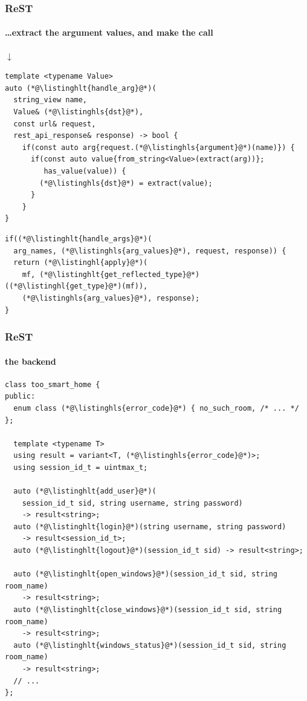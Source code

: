 \documentclass[compress,table,xcolor=table]{beamer}
\begin{document}
\begin{frame}[fragile]
  \frametitle{ReST}
  \framesubtitle{\ldots extract the argument values, and make the call}
  \smaller
  \centering $\downarrow$
  \begin{lstlisting}[language=c++2x,basicstyle=\scriptsize\ttfamily]
template <typename Value>
auto (*@\listinghlt{handle_arg}@*)(
  string_view name,
  Value& (*@\listinghls{dst}@*),
  const url& request,
  rest_api_response& response) -> bool {
    if(const auto arg{request.(*@\listinghls{argument}@*)(name)}) {
      if(const auto value{from_string<Value>(extract(arg))};
         has_value(value)) {
        (*@\listinghls{dst}@*) = extract(value);
      }
    }
}
  \end{lstlisting}
  \begin{lstlisting}[language=c++2x,basicstyle=\footnotesize\ttfamily]
if((*@\listinghlt{handle_args}@*)(
  arg_names, (*@\listinghls{arg_values}@*), request, response)) {
  return (*@\listinghl{apply}@*)(
    mf, (*@\listinghlt{get_reflected_type}@*)((*@\listinghl{get_type}@*)(mf)),
    (*@\listinghls{arg_values}@*), response);
}
  \end{lstlisting}
\end{frame}
\begin{frame}[fragile]
  \frametitle{ReST}
  \framesubtitle{the backend}
  \begin{lstlisting}[language=c++2x,basicstyle=\scriptsize\ttfamily]
class too_smart_home {
public:
  enum class (*@\listinghls{error_code}@*) { no_such_room, /* ... */ };

  template <typename T>
  using result = variant<T, (*@\listinghls{error_code}@*)>;
  using session_id_t = uintmax_t;

  auto (*@\listinghlt{add_user}@*)(
    session_id_t sid, string username, string password)
    -> result<string>;
  auto (*@\listinghlt{login}@*)(string username, string password)
    -> result<session_id_t>;
  auto (*@\listinghlt{logout}@*)(session_id_t sid) -> result<string>;

  auto (*@\listinghlt{open_windows}@*)(session_id_t sid, string room_name)
    -> result<string>;
  auto (*@\listinghlt{close_windows}@*)(session_id_t sid, string room_name)
    -> result<string>;
  auto (*@\listinghlt{windows_status}@*)(session_id_t sid, string room_name)
    -> result<string>;
  // ...
};
  \end{lstlisting}
\end{frame}
\end{document}
